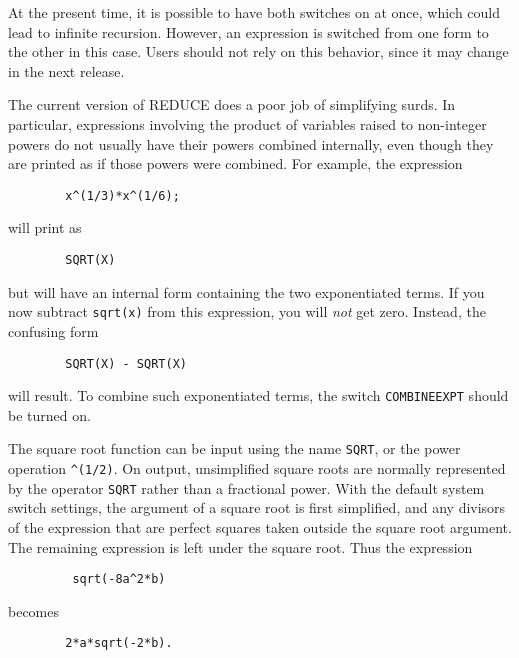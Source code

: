 \documentclass[11pt,letterpaper]{book}
\makeatletter
\newcommand{\REDUCE}{REDUCE}
\newcommand{\underscore}{\_}
\newcommand{\ttindex}[1]{{\renewcommand{\_}{\protect\underscore}%
                          \index{#1@{\tt #1}}}}
\makeatother
\begin{document}
At the present time, it is possible to have both switches on at once,
which could lead to infinite recursion.  However, an expression is
switched from one form to the other in this case.  Users should not rely
on this behavior, since it may change in the next release.

The current version of {\REDUCE} does a poor job of simplifying surds.  In
particular, expressions involving the product of variables raised to
non-integer powers do not usually have their powers combined internally,
even though they are printed as if those powers were combined.  For
example, the expression
{\small\begin{verbatim}
        x^(1/3)*x^(1/6);
\end{verbatim}}
will print as
{\small\begin{verbatim}
        SQRT(X)
\end{verbatim}}
but will have an internal form containing the two exponentiated terms.
If you now subtract {\tt sqrt(x)} from this expression, you will {\em not\/}
get zero.  Instead, the confusing form
{\small\begin{verbatim}
        SQRT(X) - SQRT(X)
\end{verbatim}}
will result.  To combine such exponentiated terms, the switch
{\tt COMBINEEXPT}\ttindex{COMBINEEXPT} should be turned on.

The square root function can be input using the name {\tt SQRT}, or the
power operation {\tt \verb|^|(1/2)}.  On output, unsimplified square roots
are normally represented by the operator {\tt SQRT} rather than a
fractional power.  With the default system switch settings, the argument
of a square root is first simplified, and any divisors of the expression
that are perfect squares taken outside the square root argument.  The
remaining expression is left under the square root.
Thus the expression
{\small\begin{verbatim}
         sqrt(-8a^2*b)
 \end{verbatim}}
becomes
{\small\begin{verbatim}
        2*a*sqrt(-2*b).
\end{verbatim}}
\end{document}
